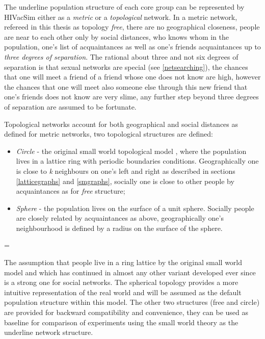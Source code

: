The underline population structure of each core group can be represented by HIVacSim
either as a \emph{metric} or a \emph{topological} network. In a metric network, refereed
in this thesis as topology \emph{free}, there are no geographical closeness, people are
near to each other only by social distances, who knows whom in the population, one's list
of acquaintances as well as one's friends acquaintances up to \emph{three degrees of
separation}. The rational about three and not six degrees of separation is that sexual
networks are special (see \ref{netsearching}), the chances that one will meet a friend of
a friend whose one does not know are high, however the chances that one will meet also
someone else through this new friend that one's friends does not know are very slime, any
further step beyond three degrees of separation are assumed to be fortunate.

Topological networks account for both geographical and social distances as defined for
metric networks, two topological structures are defined:
\parskip=0pt
\begin{itemize}
    \item \emph{Circle} - the original small world topological model \cite{Watts1999},
    where the population lives in a lattice ring with periodic boundaries conditions.
    Geographically one is close to \emph{k} neighbours on one's left and right as
    described in sections \ref{latticegraphs} and \ref{smgraphs}, socially one is close
    to other people by acquaintances as for \emph{free} structure;
    \item \emph{Sphere} - the population lives on the surface of a unit sphere. Socially
    people are closely related by acquaintances as above, geographically one's
    neighbourhood is defined by a radius on the surface of the sphere.
\end{itemize}
\parskip=\baselineskip

The assumption that people live in a ring lattice by the original small world model
\cite{Watts1999} and which has continued in almost any other variant developed ever since
\cite{Newman1999, Boots1999,Moore2000, Newman2000a, Kuperman2001, Kleinberg2000,
Kleinfeld2002} is a strong one for social networks. The spherical topology provides a
more intuitive representation of the real world and will be assumed as the default
population structure within this model. The other two structures (free and circle) are
provided for backward compatibility and convenience, they can be used as baseline for
comparison of experiments using the small world theory as the underline network
structure.

